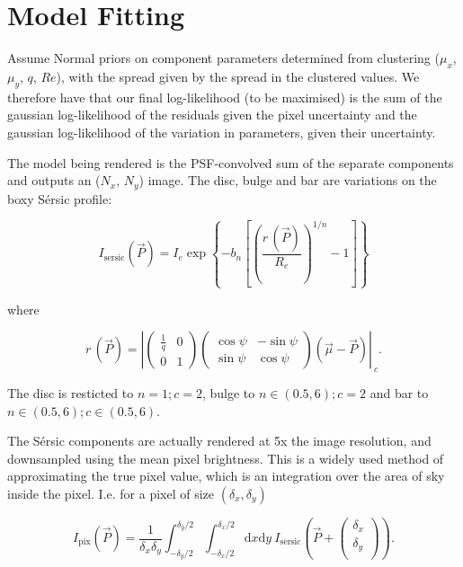\documentclass[../main.tex]{subfiles}
\begin{document}
\section{Model Fitting}
\label{sec:appendix_model_fitting}
Assume Normal priors on component parameters determined from clustering ($\mu_x$, $\mu_y$, $q$, $Re$), with the spread given by the spread in the clustered values. We therefore have that our final log-likelihood (to be maximised) is the sum of the gaussian log-likelihood of the residuals given the pixel uncertainty and the gaussian log-likelihood of the variation in parameters, given their uncertainty.

The model being rendered is the PSF-convolved sum of the separate components and outputs an ($N_x$, $N_y$) image. The disc, bulge and bar are variations on the boxy S\'ersic profile:

\begin{equation}
I_\mathrm{sersic}(\vec{P}) = I_e \exp\left\{-b_n\left[\left(\frac{r\,(\vec{P})}{R_e}\right)^{1/n} - 1\right]\right\}
\end{equation}

where

\begin{equation}
r\,(\vec{P}) = \left|\begin{pmatrix}
\frac{1}{q} & 0 \\
0 & 1
\end{pmatrix}\begin{pmatrix}
\cos\psi & -\sin\psi\\
\sin\psi & \cos\psi
\end{pmatrix}\left(\vec\mu - \vec{P}\right)\right|_{\ c}.
\end{equation}

The disc is resticted to $n=1; c=2$, bulge to $n\in(0.5, 6); c=2$ and bar to $n\in(0.5, 6); c\in(0.5, 6)$.

The S\'ersic components are actually rendered at 5x the image resolution, and downsampled using the mean pixel brightness. This is a widely used method of approximating the true pixel value, which is an integration over the area of sky inside the pixel. I.e. for a pixel of size $(\delta_x, \delta_y)$

\begin{equation}
I_\mathrm{pix}(\vec{P}) = \frac{1}{\delta_x \delta_y}\int_{-\delta_y/2}^{\delta_y/2}\int_{-\delta_x/2}^{\delta_x/2}\mathrm{d}x\mathrm{d}y\ I_\mathrm{sersic}\left(\vec{P} + \begin{pmatrix}
\delta_x \\
\delta_y \\
\end{pmatrix}\right).
\end{equation}
\end{document}

